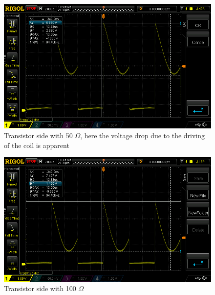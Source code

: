 \begin{figure}[H]
    \centering
    \includegraphics[width=\textwidth]{06_My_Testing_Results/figures/Out_from_transistor/125kHz_5V-125kHz_resonance_50ohm.png}
    \caption{Transistor side with 50 $\Omega$, here the voltage drop due to the driving of the coil is apparent}
    \label{fig:06:50Ohm}
\end{figure}
\begin{figure}[H]
    \centering
    \includegraphics[width=\textwidth]{06_My_Testing_Results/figures/Out_from_transistor/125kHz_5V-125kHz_resonance_100ohm.png}
    \caption{Transistor side with 100 $\Omega$}
    \label{fig:06:100Ohm}
\end{figure}


